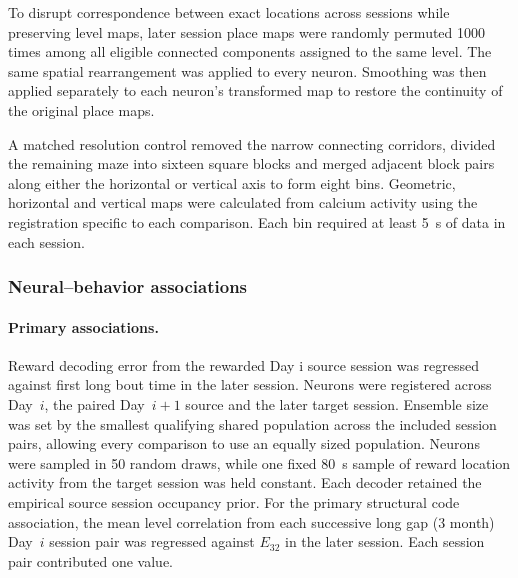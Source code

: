 \documentclass[fleqn,10pt]{wlscirep}
\begin{document}
To disrupt correspondence between exact locations across sessions while preserving level maps, later session place maps were randomly permuted 1000 times among all eligible connected components assigned to the same level. The same spatial rearrangement was applied to every neuron. Smoothing was then applied separately to each neuron's transformed map to restore the continuity of the original place maps.

A matched resolution control removed the narrow connecting corridors, divided the remaining maze into sixteen square blocks and merged adjacent block pairs along either the horizontal or vertical axis to form eight bins. Geometric, horizontal and vertical maps were calculated from calcium activity using the registration specific to each comparison. Each bin required at least 5~s of data in each session. 

\subsubsection*{Neural--behavior associations}

\paragraph*{Primary associations.}
Reward decoding error from the rewarded Day i source session was regressed against first long bout time in the later session. Neurons were registered across Day~$i$, the paired Day~$i+1$ source and the later target session. Ensemble size was set by the smallest qualifying shared population across the included session pairs, allowing every comparison to use an equally sized population. Neurons were sampled in 50 random draws, while one fixed 80~s sample of reward location activity from the target session was held constant. Each decoder retained the empirical source session occupancy prior. For the primary structural code association, the mean level correlation from each successive long gap (3 month) Day~$i$ session pair was regressed against $E_{32}$ in the later session. Each session pair contributed one value. 
\end{document}
